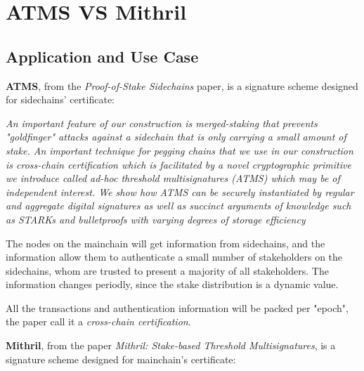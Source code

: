 \documentclass{article}
\begin{document}
\section{ATMS VS Mithril}


\subsection{Application and Use Case}

\textbf{ATMS},
from the \textit{Proof-of-Stake Sidechains} paper, is a signature scheme designed for sidechains' certificate:

\vspace{0.3cm}

\textit{An important feature of our construction is merged-staking
that prevents "goldfinger" attacks against a sidechain that is only carrying a small amount of stake. An important technique for pegging chains that we use in our construction is cross-chain certification which is facilitated by a novel cryptographic primitive we introduce called ad-hoc threshold multisignatures (ATMS) which may be of independent interest. We show how ATMS can be securely instantiated by regular and aggregate digital signatures as well as succinct arguments of knowledge such as STARKs and bulletproofs with varying degrees of storage efficiency}

\vspace{0.3cm}

The nodes on the mainchain will get information from sidechains, and the information allow them to authenticate a small number of stakeholders on the sidechains, whom are trusted to present a majority of all stakeholders. The information changes periodly, since the stake distribution is a dynamic value.


All the transactions and authentication information will be packed per "epoch", the paper call it a \textit{cross-chain certification}.


\vspace{0.3cm}


\textbf{Mithril}, from the paper \textit{Mithril: Stake-based Threshold Multisignatures}, is a signature scheme designed for mainchain's certificate:

\vspace{0.3cm}
\end{document}
